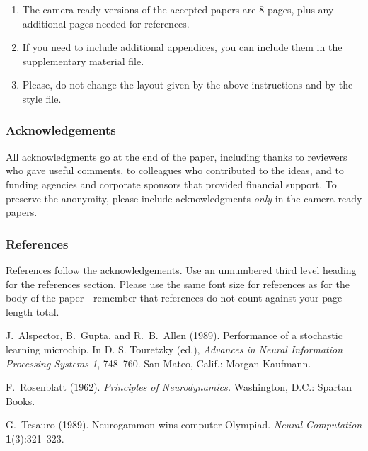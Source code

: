 \documentclass[twoside]{article}
\begin{document}
\begin{enumerate}

    \item The camera-ready versions of the accepted papers are 8
      pages, plus any additional pages needed for references.

    \item If you need to include additional appendices,
      you can include them in the supplementary
      material file.

    \item Please, do not change the layout given by the above
      instructions and by the style file.

\end{enumerate}

\subsubsection*{Acknowledgements}
All acknowledgments go at the end of the paper, including thanks to reviewers who gave useful comments, to colleagues who contributed to the ideas, and to funding agencies and corporate sponsors that provided financial support. 
To preserve the anonymity, please include acknowledgments \emph{only} in the camera-ready papers.


\subsubsection*{References}

References follow the acknowledgements.  Use an unnumbered third level
heading for the references section.  Please use the same font
size for references as for the body of the paper---remember that
references do not count against your page length total.

\begin{thebibliography}{}
\setlength{\itemindent}{-\leftmargin}
\makeatletter\renewcommand{\@biblabel}[1]{}\makeatother
\bibitem{} J.~Alspector, B.~Gupta, and R.~B.~Allen (1989).
    \newblock Performance of a stochastic learning microchip.
    \newblock In D. S. Touretzky (ed.),
    \textit{Advances in Neural Information Processing Systems 1}, 748--760.
    San Mateo, Calif.: Morgan Kaufmann.

\bibitem{} F.~Rosenblatt (1962).
    \newblock \textit{Principles of Neurodynamics.}
    \newblock Washington, D.C.: Spartan Books.

\bibitem{} G.~Tesauro (1989).
    \newblock Neurogammon wins computer Olympiad.
    \newblock \textit{Neural Computation} \textbf{1}(3):321--323.
\end{thebibliography}
\end{document}
